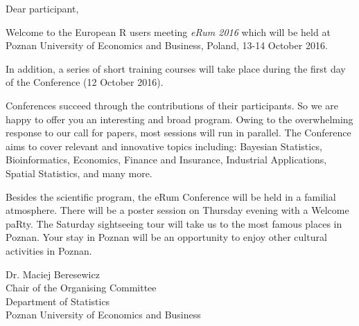 Dear participant,

Welcome to the European R users meeting \textit{eRum 2016} which will be held at Poznan University of Economics and Business, Poland, 13-14 October 2016.

In addition, a series of short training courses will take place during the first day of the Conference (12 October 2016).

Conferences succeed through the contributions of their participants. So we are happy to offer you an interesting and broad program. Owing to the overwhelming response to our call for papers, most sessions will run in parallel. The Conference aims to cover relevant and innovative topics including: Bayesian Statistics, Bioinformatics, Economics, Finance and Insurance, Industrial Applications, Spatial Statistics, and many more.

Besides the scientific program, the eRum Conference will be held in a familial atmosphere. There will be a poster session on Thursday evening with a Welcome paRty. The Saturday sightseeing tour will take us to the most famous places in Poznan. Your stay in Poznan will be an opportunity to enjoy other cultural activities in Poznan.

\vspace{1.5cm}

\begin{flushleft}
Dr. Maciej Beresewicz \\
\vspace{0.5cm}
Chair of the Organising Committee \\ 
Department of Statistics \\ 
Poznan University of Economics and Business
\end{flushleft}
